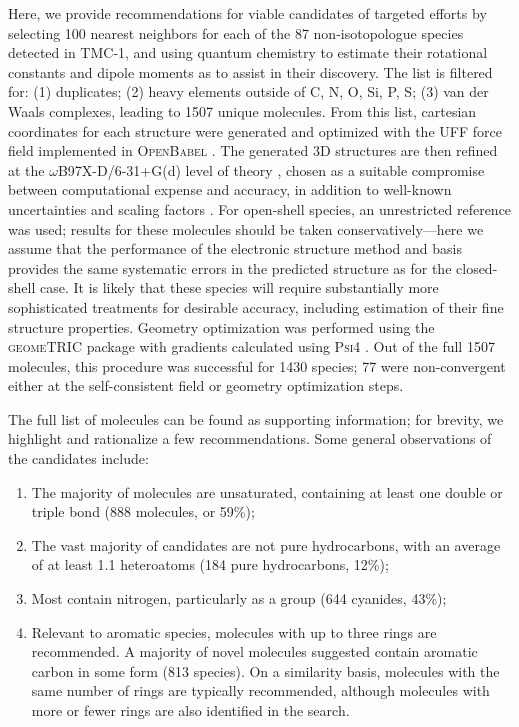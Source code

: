 \documentclass[twocolumn]{aastex63}
\begin{document}
Here, we provide recommendations for viable candidates of targeted efforts by selecting 100 nearest neighbors for each of the 87 non-isotopologue species detected in TMC-1, and using quantum chemistry to estimate their rotational constants and dipole moments as to assist in their discovery. The list is filtered for: (1) duplicates; (2) heavy elements outside of C, N, O, Si, P, S; (3) van der Waals complexes, leading to 1507 unique molecules. From this list, cartesian coordinates for each structure were generated and optimized with the UFF force field \cite{rappe_uff_1992} implemented in \textsc{OpenBabel} \cite{oboyle_open_2011}. The generated 3D structures are then refined at the $\omega$B97X-D/6-31+G(d) level of theory \citep{chai_long-range_2008,rassolov_6-31g*_1998}, chosen as a suitable compromise between computational expense and accuracy, in addition to well-known uncertainties and scaling factors \citep{lee_bayesian_2020}. For open-shell species, an unrestricted reference was used; results for these molecules should be taken conservatively---here we assume that the performance of the electronic structure method and basis provides the same systematic errors in the predicted structure as for the closed-shell case. It is likely that these species will require substantially more sophisticated treatments for desirable accuracy, including estimation of their fine structure properties. Geometry optimization was performed using the \textsc{geomeTRIC} package \citep{wang_geometry_2016} with gradients calculated using \textsc{Psi4} \citep{parrish_psi4_2017}. Out of the full 1507 molecules, this procedure was successful for 1430 species; 77 were non-convergent either at the self-consistent field or geometry optimization steps.

The full list of molecules can be found as supporting information; for brevity, we highlight and rationalize a few recommendations. Some general observations of the candidates include:

\begin{enumerate}
    \item The majority of molecules are unsaturated, containing at least one double or triple bond (888 molecules, or 59\%);
    \item The vast majority of candidates are not pure hydrocarbons, with an average of at least 1.1 heteroatoms (184 pure hydrocarbons, 12\%);
    \item Most contain nitrogen, particularly as a  group (644 cyanides, 43\%);
    \item Relevant to aromatic species, molecules with up to three rings are recommended. A majority of novel molecules suggested contain aromatic carbon in some form (813 species). On a similarity basis, molecules with the same number of rings are typically recommended, although molecules with more or fewer rings are also identified in the search.
\end{enumerate}
\end{document}
